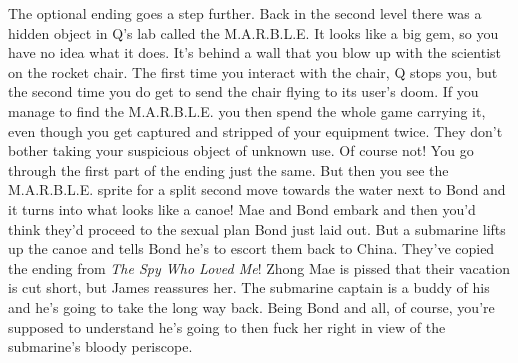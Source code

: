 \documentclass{book}
\begin{document}
The optional ending goes a step further. Back in the second level there was a hidden object in Q’s lab called the M.A.R.B.L.E. It looks like a big gem, so you have no idea what it does. It’s behind a wall that you blow up with the scientist on the rocket chair. The first time you interact with the chair, Q stops you, but the second time you do get to send the chair flying to its user’s doom. If you manage to find the M.A.R.B.L.E. you then spend the whole game carrying it, even though you get captured and stripped of your equipment twice. They don’t bother taking your suspicious object of unknown use. Of course not! You go through the first part of the ending just the same. But then you see the M.A.R.B.L.E. sprite for a split second move towards the water next to Bond and it turns into what looks like a canoe! Mae and Bond embark and then you’d think they’d proceed to the sexual plan Bond just laid out. But a submarine lifts up the canoe and tells Bond he’s to escort them back to China. They’ve copied the ending from \emph{The Spy Who Loved Me}! Zhong Mae is pissed that their vacation is cut short, but James reassures her. The submarine captain is a buddy of his and he’s going to take the long way back. Being Bond and all, of course, you’re supposed to understand he’s going to then fuck her right in view of the submarine’s bloody periscope.\par
\FloatBarrier\vspace{\baselineskip}\centering
\begin{minipage}{0.45\linewidth}\end{minipage}\vspace{2pt}
\begin{minipage}{0.45\linewidth}\end{minipage}\vspace{2pt}
\begin{minipage}{0.45\linewidth}\end{minipage}\vspace{2pt}
\begin{minipage}{0.45\linewidth}\end{minipage}\vspace{2pt}
\begin{minipage}{0.45\linewidth}\end{minipage}
\end{document}
